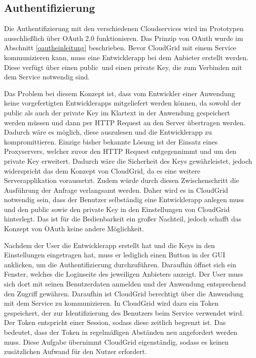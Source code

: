 \subsection{Authentifizierung}
\label{systementwurf-auth}
Die Authentifizierung mit den verschiedenen Cloudservices wird im Prototypen ausschließlich über OAuth 2.0 funktionieren.
Das Prinzip von OAuth wurde im Abschnitt \ref{oautheinleitung} beschrieben.
Bevor CloudGrid mit einem Service kommunizieren kann, muss eine Entwicklerapp bei dem Anbieter erstellt werden.
Diese verfügt über einen \frqq public\flqq\ und einen \frqq private Key\flqq , die zum Verbinden mit dem Service notwendig sind.

Das Problem bei diesem Konzept ist, dass vom Entwickler einer Anwendung keine vorgefertigten Entwicklerapps mitgeliefert werden können, da sowohl der public als auch der private Key im Klartext in der Anwendung gespeichert werden müssen und dann per \ac{HTTP} Request an den Server übertragen werden.
Dadurch wäre es möglich, diese auszulesen und die Entwicklerapp zu kompromittieren.
Einzige bisher bekannte Lösung ist der Einsatz eines Proxyservers, welcher zuvor den \ac{HTTP} Request entgegennimmt und um den private Key erweitert.
Dadurch wäre die Sicherheit des Keys gewährleistet, jedoch widerspricht das dem Konzept von CloudGrid, da es eine weitere Serverapplikation voraussetzt.
Zudem würde durch diesen Zwischenschritt die Ausführung der Anfrage verlangsamt werden.
Daher wird es in CloudGrid notwendig sein, dass der Benutzer selbständig eine Entwicklerapp anlegen muss und den public sowie den private Key in den Einstellungen von CloudGrid hinterlegt.
Das ist für die Bedienbarkeit ein großer Nachteil, jedoch schafft das Konzept von OAuth keine andere Möglichkeit.

Nachdem der User die Entwicklerapp erstellt hat und die Keys in den Einstellungen eingetragen hat, muss er lediglich einen Button in der \ac{GUI} anklicken, um die Authentifizierung durchzuführen.
Daraufhin öffnet sich ein Fenster, welches die Loginseite des jeweiligen Anbieters anzeigt.
Der User muss sich dort mit seinen Benutzerdaten anmelden und der Anwendung entsprechend den Zugriff gewähren.
Daraufhin ist CloudGrid berechtigt über die Anwendung mit dem Service zu kommunizieren.
In CloudGrid wird dazu ein Token gespeichert, der zur Identifizierung des Benutzers beim Service verwendet wird.
Der Token entspricht einer Session, sodass diese zeitlich begrenzt ist.
Das bedeutet, dass der Token in regelmäßigen Abständen neu angefordert werden muss.
Diese Aufgabe übernimmt CloudGrid eigenständig, sodass es keinen zusätzlichen Aufwand für den Nutzer erfordert.

